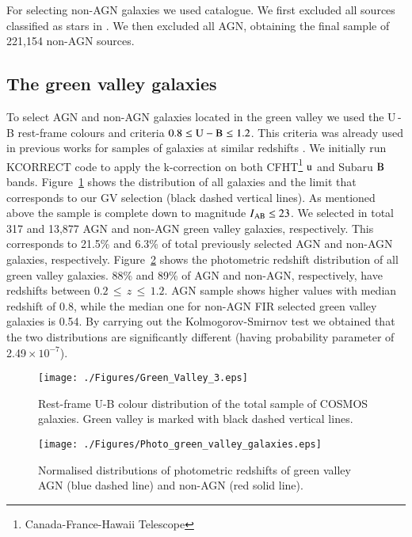 \documentclass[fleqn,usenatbib]{mnras}
\begin{document}
For selecting non-AGN galaxies we used \cite{Tasca2009} catalogue. We first excluded all sources classified as stars in \citet{Leauthaud}. We then excluded all AGN, obtaining the final sample of 221,154 non-AGN sources.  

\subsection{The green valley galaxies}

To select AGN and non-AGN galaxies located in the green valley we used the U\,-\,B rest-frame colours and criteria $\rm{0.8\leq U-B\leq 1.2}$. This criteria was already used in previous works for samples of galaxies at similar redshifts \citep[e.g.][]{Nandra, willmer07}. We initially run KCORRECT code \citep{Blanton} to apply the k-correction on both CFHT\footnote{Canada-France-Hawaii Telescope} $\rm{u}$ and Subaru $\rm{B}$ bands. Figure~\ref{fig_GV} shows the distribution of all galaxies and the limit that corresponds to our GV selection (black dashed vertical lines). As mentioned above the sample is complete down to magnitude $I\rm{_{AB} \leq 23}$. We selected in total 317 and 13,877 AGN and non-AGN green valley galaxies, respectively. This corresponds to 21.5\% and 6.3\% of total previously selected AGN and non-AGN galaxies, respectively. Figure~\ref{fig_GV_Phot} shows the photometric redshift distribution of all green valley galaxies. 88\% and 89\% of AGN and non-AGN, respectively, have redshifts between $0.2\,\leq\,z\,\leq\,1.2$. AGN sample shows higher values with median redshift of 0.8, while the median one for non-AGN FIR selected green valley galaxies is 0.54. By carrying out the Kolmogorov-Smirnov test we obtained that the two distributions are significantly different (having probability parameter of 2.49\,$\times\,10^{-7}$).

\begin{figure}
\centering
\texttt{[image: ./Figures/Green\_Valley\_3.eps]}
\caption{Rest-frame U-B colour distribution of the total sample of COSMOS galaxies. Green valley is marked with black dashed vertical lines.}
\label{fig_GV}
\end{figure}

\begin{figure}
\centering
\texttt{[image: ./Figures/Photo\_green\_valley\_galaxies.eps]}
\caption{Normalised distributions of photometric redshifts of green valley AGN (blue dashed line) and non-AGN (red solid line).}
\label{fig_GV_Phot}
\end{figure}
\end{document}
